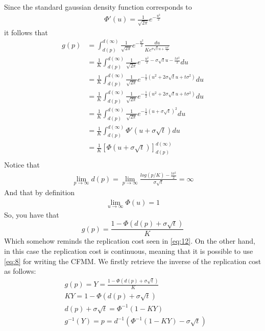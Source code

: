 \documentclass[12pt]{article}
\begin{document}
Since the standard gaussian density function corresponds to
\begin{align*}
    \Phi'(u) = \frac{1}{\sqrt{2\pi}} e^{-\frac{u^2}{2}}
\end{align*}
it follows that
\begin{align*}
    g(p) & = \int_{d(p)}^{d(\infty)} \frac{1}{\sqrt{2\pi}} e^{-\frac{u^2}{2}} \frac{du}{K e^{\sigma \sqrt{t}u + \frac{t\sigma^2}{2}}}  \\
         & = \frac{1}{K}\int_{d(p)}^{d(\infty)} \frac{1}{\sqrt{2\pi}} e^{-\frac{u^2}{2}-\sigma \sqrt{t}u -\frac{t\sigma^2}{2}} du      \\
         & = \frac{1}{K}\int_{d(p)}^{d(\infty)} \frac{1}{\sqrt{2\pi}} e^{-\frac{1}{2}\left(u^2+2\sigma \sqrt{t}u +t\sigma^2\right)} du \\
         & = \frac{1}{K}\int_{d(p)}^{d(\infty)} \frac{1}{\sqrt{2\pi}} e^{-\frac{1}{2}\left(u^2+2\sigma \sqrt{t}u +t\sigma^2\right)} du \\
         & = \frac{1}{K}\int_{d(p)}^{d(\infty)} \frac{1}{\sqrt{2\pi}} e^{-\frac{1}{2}(u+\sigma \sqrt{t})^2} du                         \\
         & = \frac{1}{K}\int_{d(p)}^{d(\infty)} \Phi'(u+\sigma \sqrt{t}) du                                                            \\
         & = \frac{1}{K} \left[\Phi(u+\sigma \sqrt{t})\right]^{d(\infty)}_{d(p)}                                                       \\
\end{align*}
Notice that
\begin{align*}
    \lim_{p\rightarrow\infty} d(p) = \lim_{p\rightarrow\infty} \frac{log(p/K)-\frac{t\sigma^2}{2}}{\sigma \sqrt{t}} = \infty
\end{align*}
And that by definition
\begin{align*}
    \lim_{u\rightarrow\infty} \Phi(u) = 1
\end{align*}
So, you have that
\begin{equation}
    g(p) = \frac{1-\Phi(d(p)+\sigma\sqrt{t})}{K}
\end{equation}
Which somehow reminds the replication cost seen in \eqref{eq:12}. On the other hand, in this case the replication cost is continuous, meaning that it is possible to use \eqref{eq:8} for writing the CFMM.\newline
We firstly retrieve the inverse of the replication cost as follows:
\begin{align*}
     & g(p) = Y = \frac{1-\Phi(d(p)+\sigma\sqrt{t})}{K}       \\
     & KY = 1-\Phi(d(p)+\sigma\sqrt{t})                       \\
     & d(p)+\sigma\sqrt{t} = \Phi^{-1}(1-KY)                  \\
     & g^{-1}(Y) = p = d^{-1}(\Phi^{-1}(1-KY)-\sigma\sqrt{t}) \\
\end{align*}
\end{document}
